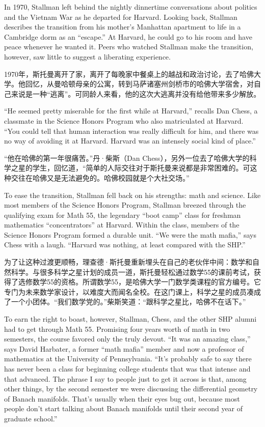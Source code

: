\ifdefined\eng
In 1970, Stallman left behind the nightly dinnertime conversations about politics and the Vietnam War as he departed for Harvard. Looking back, Stallman describes the transition from his mother's Manhattan apartment to life in a Cambridge dorm as an ``escape.'' At Harvard, he could go to his room and have peace whenever he wanted it. Peers who watched Stallman make the transition, however, saw little to suggest a liberating experience.
\fi

\ifdefined\chs
1970年，斯托曼离开了家，离开了每晚家中餐桌上的越战和政治讨论，去了哈佛大学。他回忆，从曼哈顿母亲的公寓，转到马萨诸塞州剑桥市的哈佛大学宿舍，对自己来说是一种``逃离''。可同龄人来看，他的这次大逃离并没有给他带来多少解放。
\fi

\ifdefined\eng
``He seemed pretty miserable for the first while at Harvard,'' recalls Dan Chess, a classmate in the Science Honors Program who also matriculated at Harvard. ``You could tell that human interaction was really difficult for him, and there was no way of avoiding it at Harvard. Harvard was an intensely social kind of place.''
\fi

\ifdefined\chs
``他在哈佛的第一年很痛苦。''丹·柴斯（Dan
Chess），另外一位去了哈佛大学的科学之星的学生，回忆道，``简单的人际交往对于斯托曼来说都是非常困难的。可这种交往在哈佛又是无法避免的。哈佛校园就是个大社交场。''
\fi

\ifdefined\eng
To ease the transition, Stallman fell back on his strengths: math and science. Like most members of the Science Honors Program, Stallman breezed through the qualifying exam for Math 55, the legendary ``boot camp'' class for freshman mathematics ``concentrators'' at Harvard. Within the class, members of the Science Honors Program formed a durable unit. ``We were the math mafia,'' says Chess with a laugh. ``Harvard was nothing, at least compared with the SHP.''
\fi

\ifdefined\chs
为了让这种过渡更顺畅，理查德·斯托曼重新埋头在自己的老伙伴中间：数学和自然科学。与很多科学之星计划的成员一道，斯托曼轻松通过数学55的课前考试，获得了选修数学55的资格。所谓数学55，是哈佛大学一门数学类课程的官方编号。它专门为未来数学家设计，以难度大而闻名全校。在这门课上，科学之星的成员凑成了一个小团体。``我们数学党的。''柴斯笑道：``跟科学之星比，哈佛不在话下。''
\fi

\ifdefined\eng
To earn the right to boast, however, Stallman, Chess, and the other SHP alumni had to get through Math 55. Promising four years worth of math in two semesters, the course favored only the truly devout. ``It was an amazing class,'' says David Harbater, a former ``math mafia'' member and now a professor of mathematics at the University of Pennsylvania. ``It's probably safe to say there has never been a class for beginning college students that was that intense and that advanced. The phrase I say to people just to get it across is that, among other things, by the second semester we were discussing the differential geometry of Banach manifolds. That's usually when their eyes bug out, because most people don't start talking about Banach manifolds until their second year of graduate school.''
\fi


